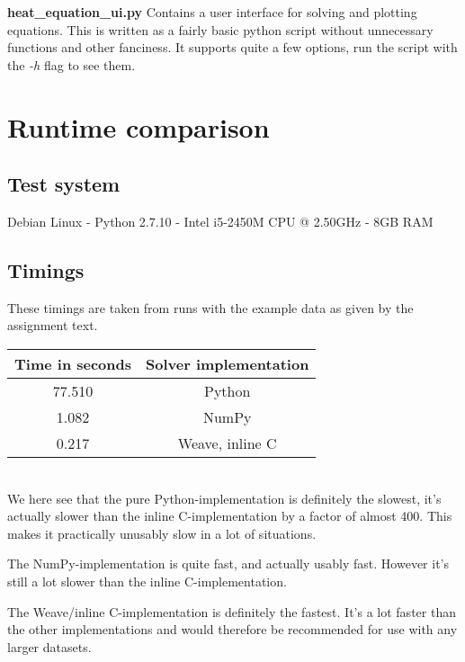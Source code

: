 \documentclass[]{article}
\begin{document}
\noindent\textbf{heat\_equation\_ui.py}
Contains a user interface for solving and plotting equations. This is written as
a fairly basic python script without unnecessary functions and other fanciness.
It supports quite a few options, run the script with the \emph{-h} flag to see
them.


\section{Runtime comparison}
\subsection{Test system}
Debian Linux - Python 2.7.10 - Intel i5-2450M CPU @ 2.50GHz - 8GB RAM
\subsection{Timings}
These timings are taken from runs with the example data as given by the
assignment text. \\
\begin{tabular}{| c | c |}
	\hline
	Time in seconds & Solver implementation \\
	\hline
	77.510 & Python \\
	1.082 & NumPy \\
	0.217 & Weave, inline C \\
	\hline
\end{tabular} \\
We here see that the pure Python-implementation is definitely the slowest, it's
actually slower than the inline C-implementation by a factor of almost 400. This
makes it practically unusably slow in a lot of situations.

The NumPy-implementation is quite fast, and actually usably fast. However it's
still a lot slower than the inline C-implementation.

The Weave/inline C-implementation is definitely the fastest. It's a lot faster
than the other implementations and would therefore be recommended for use with
any larger datasets.
\end{document}
